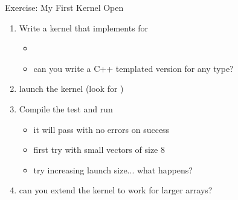 \begin{frame}[fragile]{Exercise: My First Kernel}
    Open 

    \begin{enumerate}
        \item Write a kernel that implements \axpy for 
        \begin{itemize}
            \item {}
            \item \extra can you write a C++ templated version for any type?
        \end{itemize}

    \item launch the kernel (look for )
        \item Compile the test and run
        \begin{itemize}
            \item it will pass with no errors on success
            \item first try with small vectors of size 8
            \item try increasing launch size... what happens?
        \end{itemize}
        \item \extra can you extend the kernel to work for larger arrays?
    \end{enumerate}
\end{frame}



